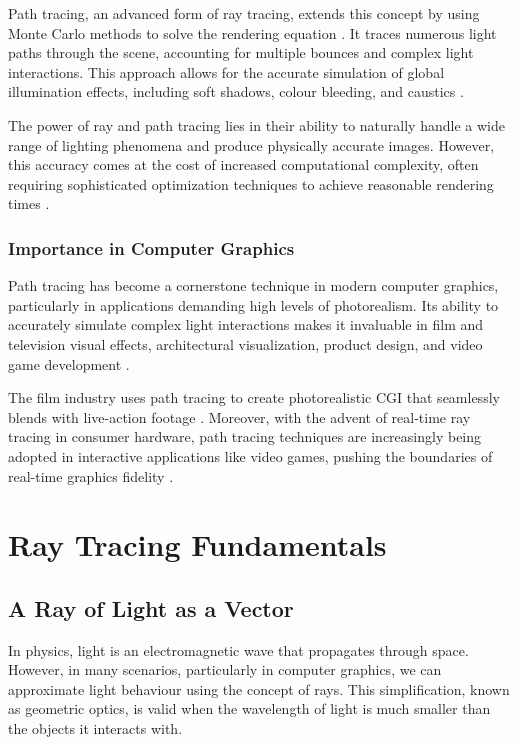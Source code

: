 \documentclass[12pt]{article}
\begin{document}
Path tracing, an advanced form of ray tracing, extends this concept by using Monte Carlo methods to solve the rendering equation \cite{Kajiya1986}. It traces numerous light paths through the scene, accounting for multiple bounces and complex light interactions. This approach allows for the accurate simulation of global illumination effects, including soft shadows, colour bleeding, and caustics \cite{Veach1997}.

The power of ray and path tracing lies in their ability to naturally handle a wide range of lighting phenomena and produce physically accurate images. However, this accuracy comes at the cost of increased computational complexity, often requiring sophisticated optimization techniques to achieve reasonable rendering times \cite{Pharr2016}.

\subsubsection{Importance in Computer Graphics}
Path tracing has become a cornerstone technique in modern computer graphics, particularly in applications demanding high levels of photorealism. Its ability to accurately simulate complex light interactions makes it invaluable in film and television visual effects, architectural visualization, product design, and video game development \cite{Keller2015}.

The film industry uses path tracing to create photorealistic CGI that seamlessly blends with live-action footage \cite{Christensen2018}. Moreover, with the advent of real-time ray tracing in consumer hardware, path tracing techniques are increasingly being adopted in interactive applications like video games, pushing the boundaries of real-time graphics fidelity \cite{Schied2017}.

\section{Ray Tracing Fundamentals}
\label{sec:fundamentals}
\subsection{A Ray of Light as a Vector}
In physics, light is an electromagnetic wave that propagates through space. However, in many scenarios, particularly in computer graphics, we can approximate light behaviour using the concept of rays. This simplification, known as geometric optics, is valid when the wavelength of light is much smaller than the objects it interacts with.
\end{document}
